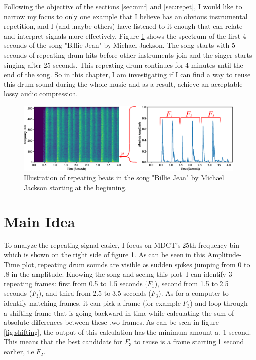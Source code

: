 
\label{chapter:proposed}

Following the objective of the sections \ref{sec:nmf} and \ref{sec:repet}, I would like to narrow my focus to only one example that I believe has an obvious instrumental repetition, and I (and maybe others) have listened to it enough that can relate and interpret signals more effectively. Figure \ref{fig:billie-jean} shows the spectrum of the first 4 seconds of the song "Billie Jean" by Michael Jackson\cite{michael_jackson_billie_1982}. The song starts with 5 seconds of repeating drum hits before other instruments join and the singer starts singing after 25 seconds. This repeating drum continues for 4 minutes until the end of the song. So in this chapter, I am investigating if I can find a way to reuse this drum sound during the whole music and as a result, achieve an acceptable lossy audio compression.

\begin{figure}[ht]     
    \includegraphics[width=\linewidth]{Figures/chap4/proposed/bj.eps}
    \caption{Illustration of repeating beats in the song "Billie Jean" by Michael Jackson\cite{michael_jackson_billie_1982} starting at the beginning.}
    \label{fig:billie-jean}
\end{figure}

\section{Main Idea}
\label{sec:idea}

To analyze the repeating signal easier, I focus on MDCT's 25th frequency bin which is shown on the right side of figure \ref{fig:billie-jean}. As can be seen in this Amplitude-Time plot, repeating drum sounds are visible as sudden spikes jumping from 0 to .8 in the amplitude. Knowing the song and seeing this plot, I can identify 3 repeating frames: first from 0.5 to 1.5 seconds ($F_1$), second from 1.5 to 2.5 seconds ($F_2$), and third from 2.5 to 3.5 seconds ($F_3$). As for a computer to identify matching frames, it can pick a frame (for example $F_3$) and loop through a shifting frame that is going backward in time while calculating the sum of absolute differences between these two frames. As can be seen in figure \ref{fig:shifting}, the output of this calculation has the minimum amount at 1 second. This means that the best candidate for $F_3$ to reuse is a frame starting 1 second earlier, i.e $F_2$.

